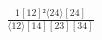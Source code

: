 \documentclass[varwidth, border=5pt]{standalone}
\begin{document}
\begin{my}
$\begin{gathered}
\scriptscriptstyle\frac{1[12]²⟨24⟩[24]}{⟨12⟩[14][23][34]}
\end{gathered}$
\end{my}
\end{document}
